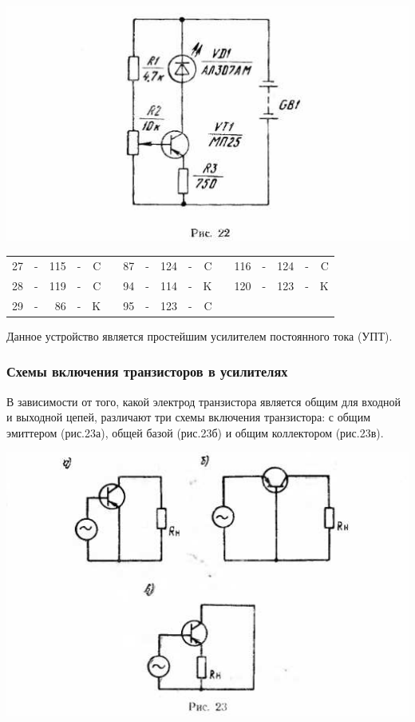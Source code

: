 \documentclass[12pt]{article}
\begin{document}
\includegraphics[width=\textwidth]{ekon3_019_1}

\hrulefill

\begin{tabular}{r c r c r p{2cm} r c r c r p{2cm} r c r c r}
27 & - & 115 & - & C &     & 87 & - & 124 & - & C &    & 116 & - & 124 & - & C\\
28 & - & 119 & - & C &     & 94 & - & 114 & - & K &    & 120 & - & 123 & - & K\\
29 & - &  86 & - & K &     & 95 & - & 123 & - & C &    &     &   &     &   &  \\
\end{tabular}

\hrulefill

Данное устройство является простейшим усилителем постоянного тока (УПТ).

\vspace*{13em}
\subsubsection{Схемы включения транзисторов в усилителях}

В зависимости от того, какой электрод транзистора является общим для входной и выходной цепей, различают три схемы включения транзистора: с общим эмиттером (рис.23а), общей базой (рис.23б) и общим коллектором (рис.23в).

\newpage
\includegraphics[scale=0.8]{ekon3_020_1}
\end{document}
